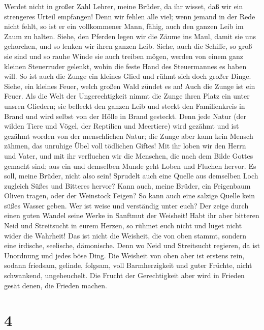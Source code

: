 Werdet nicht in großer Zahl Lehrer, meine Brüder, da ihr
wisset, daß wir ein strengeres Urteil empfangen!  Denn wir
fehlen alle viel; wenn jemand in der Rede nicht fehlt, so ist er ein
vollkommener Mann, fähig, auch den ganzen Leib im Zaum zu halten.
 Siehe, den Pferden legen wir die Zäume ins Maul, damit
sie uns gehorchen, und so lenken wir ihren ganzen Leib. 
Siehe, auch die Schiffe, so groß sie sind und so rauhe Winde sie auch
treiben mögen, werden von einem ganz kleinen Steuerruder gelenkt, wohin
die feste Hand des Steuermannes es haben will.  So ist
auch die Zunge ein kleines Glied und rühmt sich doch großer Dinge.
Siehe, ein kleines Feuer, welch großen Wald zündet es an! 
Auch die Zunge ist ein Feuer. Als die Welt der Ungerechtigkeit nimmt die
Zunge ihren Platz ein unter unsren Gliedern; sie befleckt den ganzen
Leib und steckt den Familienkreis in Brand und wird selbst von der Hölle
in Brand gesteckt.  Denn jede Natur (der wilden Tiere und
Vögel, der Reptilien und Meertiere) wird gezähmt und ist gezähmt worden
von der menschlichen Natur;  die Zunge aber kann kein
Mensch zähmen, das unruhige Übel voll tödlichen Giftes! 
Mit ihr loben wir den Herrn und Vater, und mit ihr verfluchen wir die
Menschen, die nach dem Bilde Gottes gemacht sind;  aus
ein und demselben Munde geht Loben und Fluchen hervor. Es soll, meine
Brüder, nicht also sein!  Sprudelt auch eine Quelle aus
demselben Loch zugleich Süßes und Bitteres hervor?  Kann
auch, meine Brüder, ein Feigenbaum Oliven tragen, oder der Weinstock
Feigen? So kann auch eine salzige Quelle kein süßes Wasser geben.
 Wer ist weise und verständig unter euch? Der zeige durch
einen guten Wandel seine Werke in Sanftmut der Weisheit! 
Habt ihr aber bitteren Neid und Streitsucht in eurem Herzen, so rühmet
euch nicht und lüget nicht wider die Wahrheit!  Das ist
nicht die Weisheit, die von oben stammt, sondern eine irdische,
seelische, dämonische.  Denn wo Neid und Streitsucht
regieren, da ist Unordnung und jedes böse Ding.  Die
Weisheit von oben aber ist erstens rein, sodann friedsam, gelinde,
folgsam, voll Barmherzigkeit und guter Früchte, nicht schwankend,
ungeheuchelt.  Die Frucht der Gerechtigkeit aber wird in
Frieden gesät denen, die Frieden machen.

\hypertarget{section-3}{%
\section{4}\label{section-3}}

